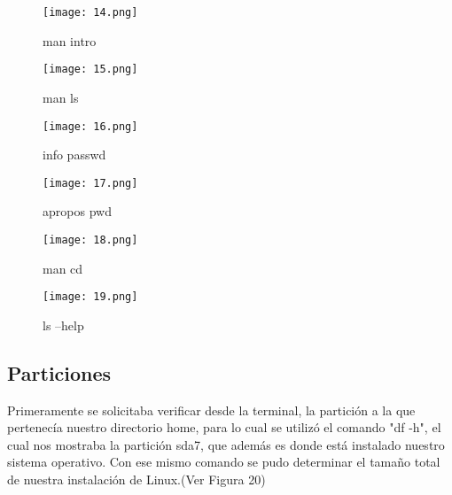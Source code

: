 \documentclass[
  letterpaper, 
  maincolor=black,
  sectioncolor=black!90,
  subsectioncolor=black!70,
  itemtextcolor=black!40,
]{fortysecondscv}
\begin{document}
\begin{center}
    \begin{figure}[H]
    \centering
    \texttt{[image: 14.png]}
    \caption{man intro}
    \label{fig:10.png}
    \end{figure}
\end{center}

\begin{center}
    \begin{figure}[H]
    \centering
    \texttt{[image: 15.png]}
    \caption{man ls}
    \label{fig:10.png}
    \end{figure}
\end{center}

\begin{center}
    \begin{figure}[H]
    \centering
    \texttt{[image: 16.png]}
    \caption{info passwd}
    \label{fig:10.png}
    \end{figure}
\end{center}

\begin{center}
    \begin{figure}[H]
    \centering
    \texttt{[image: 17.png]}
    \caption{apropos pwd}
    \label{fig:10.png}
    \end{figure}
\end{center}

\begin{center}
    \begin{figure}[H]
    \centering
    \texttt{[image: 18.png]}
    \caption{man cd}
    \label{fig:10.png}
    \end{figure}
\end{center}

\begin{center}
    \begin{figure}[H]
    \centering
    \texttt{[image: 19.png]}
    \caption{ls --help}
    \label{fig:10.png}
    \end{figure}
\end{center}

\subsection{Particiones}

{Primeramente se solicitaba verificar desde la terminal, la partición a la que pertenecía nuestro directorio home, para lo cual se utilizó el comando "df -h", el cual nos mostraba la partición sda7, que además es donde está instalado nuestro sistema operativo. Con ese mismo comando se pudo determinar el tamaño total de nuestra instalación de Linux.(Ver Figura 20)}
\end{document}
